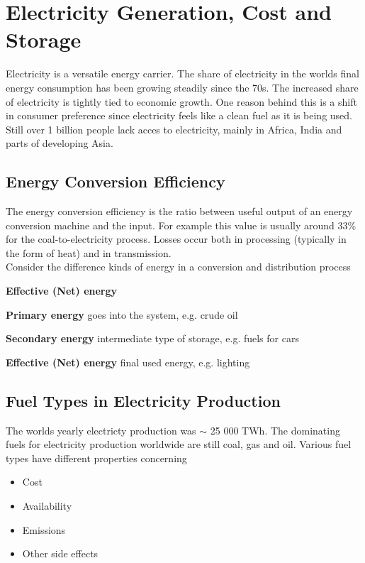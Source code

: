 \section{Electricity Generation, Cost and Storage}

Electricity is a versatile energy carrier.
The share of electricity in the worlds final energy consumption has been growing steadily since the 70s.
The increased share of electricity is tightly tied to economic growth.
One reason behind this is a shift in consumer preference since electricity feels like a clean fuel as it is being used.
Still over 1 billion people lack acces to electricity, mainly in Africa, India and parts of developing Asia.

\subsection{Energy Conversion Efficiency}
The energy conversion efficiency is the ratio between useful output of an energy conversion machine and the input.
For example this value is usually around 33\% for the coal-to-electricity process.
Losses occur both in processing (typically in the form of heat) and in transmission.\\

Consider the difference kinds of energy in a conversion and distribution process

\begin{labeling}{\textbf{Effective (Net) energy}}
    \item [\textbf{Primary energy}] goes into the system, e.g. crude oil
    \item [\textbf{Secondary energy}] intermediate type of storage, e.g. fuels for cars
    \item [\textbf{Effective (Net) energy}] final used energy, e.g. lighting
\end{labeling}

\subsection{Fuel Types in Electricity Production}

The worlds yearly electricty production was $\sim$ 25 000 TWh.
The dominating fuels for electricity production worldwide are still coal, gas and oil.
Various fuel types have different properties concerning

\begin{itemize}
    \item Cost
    \item Availability
    \item Emissions
    \item Other side effects
\end{itemize}

